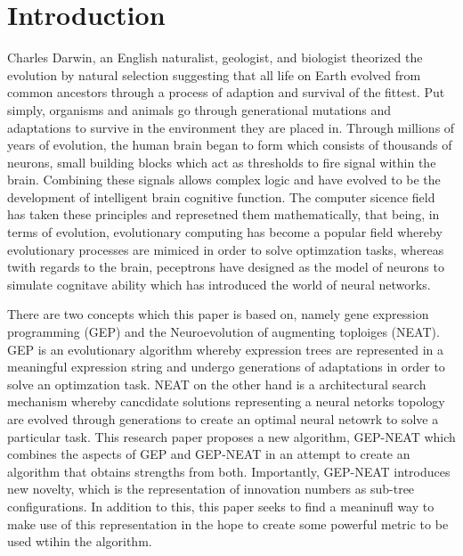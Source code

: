 \chapter{Introduction}

Charles Darwin, an English naturalist, geologist, and biologist theorized the evolution by natural selection suggesting that all life on Earth evolved from common ancestors through a process of adaption and survival of the fittest. Put simply, organisms and animals go through generational mutations and adaptations to survive in the environment they are placed in. Through millions of years of evolution, the human brain began to form which consists of thousands of neurons, small building blocks which act as thresholds to fire signal within the brain. Combining these signals allows complex logic and have evolved to be the development of intelligent brain cognitive function. The computer sicence field has taken these principles and represetned them mathematically, that being, in terms of evolution, evolutionary computing has become a popular field whereby evolutionary processes are mimiced in order to solve optimzation tasks, whereas twith regards to the brain, peceptrons have designed as the model of neurons to simulate cognitave ability which has introduced the world of neural networks. \bigskip

\noindent There are two concepts which this paper is based on, namely gene expression programming (GEP) and the Neuroevolution of augmenting toploiges (NEAT). GEP is an evolutionary algorithm whereby expression trees are represented in a meaningful expression string and undergo generations of adaptations in order to solve an optimzation task. NEAT on the other hand is a architectural search mechanism whereby cancdidate solutions representing a neural netorks topology are evolved through generations to create an optimal neural netowrk to solve a particular task. This research paper proposes a new algorithm, GEP-NEAT which combines the aspects of GEP and GEP-NEAT in an attempt to create an algorithm that obtains strengths from both. Importantly, GEP-NEAT introduces new novelty, which is the representation of innovation numbers as sub-tree configurations. In addition to this, this paper seeks to find a meaninufl way to make use of this representation in the hope to create some powerful metric to be used wtihin the algorithm.

